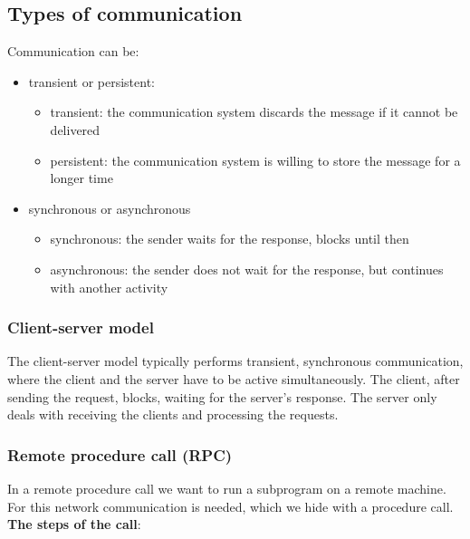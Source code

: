 \documentclass[margin=0px]{article}
\begin{document}
\subsection{Types of communication}

Communication can be:

\begin{itemize}
    \item	transient or persistent:
          \begin{itemize}
              \item	transient: the communication system discards the message if it cannot be delivered
              \item	persistent: the communication system is willing to store the message for a longer time
          \end{itemize}
    \item	synchronous or asynchronous
          \begin{itemize}
              \item	synchronous: the sender waits for the response, blocks until then
              \item	asynchronous: the sender does not wait for the response, but continues with another activity
          \end{itemize}
\end{itemize}

\subsubsection{Client-server model}

The client-server model typically performs transient, synchronous communication, where the client and the server have to be
active simultaneously. The client, after sending the request, blocks, waiting for the server's response. The server only deals with
receiving the clients and processing the requests.

\subsubsection{Remote procedure call (RPC)}

In a remote procedure call we want to run a subprogram on a remote machine. For this network communication is needed,
which we hide with a procedure call.\\

\noindent \textbf{The steps of the call}:
\end{document}
